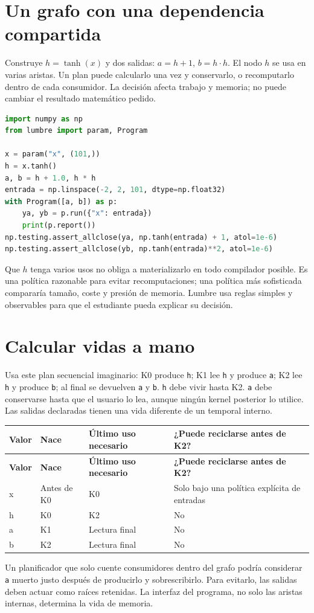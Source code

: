 \documentclass[12pt,a4paper,oneside]{report}
\begin{document}
\section{Un grafo con una dependencia compartida}
Construye $h=\tanh(x)$ y dos salidas: $a=h+1$, $b=h\cdot h$. El nodo $h$ se usa en varias aristas. Un plan puede calcularlo una vez y conservarlo, o recomputarlo dentro de cada consumidor. La decisión afecta trabajo y memoria; no puede cambiar el resultado matemático pedido.

\begin{lstlisting}[language=Python]
import numpy as np
from lumbre import param, Program

x = param("x", (101,))
h = x.tanh()
a, b = h + 1.0, h * h
entrada = np.linspace(-2, 2, 101, dtype=np.float32)
with Program([a, b]) as p:
    ya, yb = p.run({"x": entrada})
    print(p.report())
np.testing.assert_allclose(ya, np.tanh(entrada) + 1, atol=1e-6)
np.testing.assert_allclose(yb, np.tanh(entrada)**2, atol=1e-6)
\end{lstlisting}
Que $h$ tenga varios usos no obliga a materializarlo en todo compilador posible. Es una política razonable para evitar recomputaciones; una política más sofisticada compararía tamaño, coste y presión de memoria. Lumbre usa reglas simples y observables para que el estudiante pueda explicar su decisión.

\section{Calcular vidas a mano}
Usa este plan secuencial imaginario: K0 produce \texttt{h}; K1 lee \texttt{h} y produce \texttt{a}; K2 lee \texttt{h} y produce \texttt{b}; al final se devuelven \texttt{a} y \texttt{b}. \texttt{h} debe vivir hasta K2. \texttt{a} debe conservarse hasta que el usuario lo lea, aunque ningún kernel posterior lo utilice. Las salidas declaradas tienen una vida diferente de un temporal interno.

{\small
\begin{longtable}{@{}P{0.22\textwidth}P{0.23\textwidth}P{0.23\textwidth}P{0.23\textwidth}@{}}
\toprule
\textbf{Valor} & \textbf{Nace} & \textbf{Último uso necesario} & \textbf{¿Puede reciclarse antes de K2?}\\
\midrule
\endfirsthead
\toprule
\textbf{Valor} & \textbf{Nace} & \textbf{Último uso necesario} & \textbf{¿Puede reciclarse antes de K2?}\\
\midrule
\endhead
x & Antes de K0 & K0 & Solo bajo una política explícita de entradas\\
h & K0 & K2 & No\\
a & K1 & Lectura final & No\\
b & K2 & Lectura final & No\\
\bottomrule
\end{longtable}
}
Un planificador que solo cuente consumidores dentro del grafo podría considerar \texttt{a} muerto justo después de producirlo y sobrescribirlo. Para evitarlo, las salidas deben actuar como raíces retenidas. La interfaz del programa, no solo las aristas internas, determina la vida de memoria.
\end{document}
